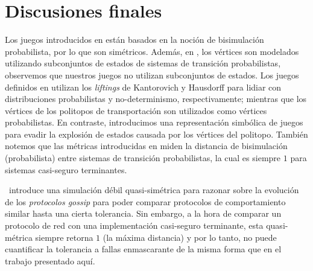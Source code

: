 \section{Discusiones finales} 
\label{sec:final_discussions_prob}

Los juegos introducidos en \cite{Bacci0LM17,BacciBLMTB19,DesharnaisGJP04,DesharnaisLT11}  están basados en la noción de bisimulación probabilista, por lo que son simétricos. Además, en \cite{DesharnaisGJP04,DesharnaisLT11}, los vértices son modelados utilizando subconjuntos de estados de sistemas de transición probabilistas, 
observemos que nuestros juegos no utilizan subconjuntos de estados. Los juegos definidos en  \cite{Bacci0LM17,BacciBLMTB19} utilizan los \textit{liftings} de Kantorovich y Hausdorff para lidiar con distribuciones probabilistas y no-determinismo, respectivamente; mientras que los vértices de los politopos de transportación son utilizados como vértices probabilistas. En contraste, introducimos una representación simbólica de juegos para evadir la explosión de estados causada por los vértices del politopo. También notemos que las métricas introducidas en \cite{Bacci0LM17,BacciBLMTB19} miden la distancia de bisimulación (probabilista) entre sistemas de transición probabilistas, la cual es siempre $1$ para sistemas casi-seguro terminantes.
		
%
\cite{LanotteMT17}~introduce una simulación débil quasi-simétrica para razonar sobre la evolución de los \emph{ protocolos gossip} para poder comparar protocolos de comportamiento similar hasta una cierta tolerancia.
Sin embargo, a la hora de comparar un protocolo de red con una implementación casi-seguro terminante, esta quasi-métrica siempre retorna $1$ (la máxima distancia) y por lo tanto, no puede cuantificar la tolerancia a fallas enmascarante de la misma forma que en el trabajo presentado aquí.


